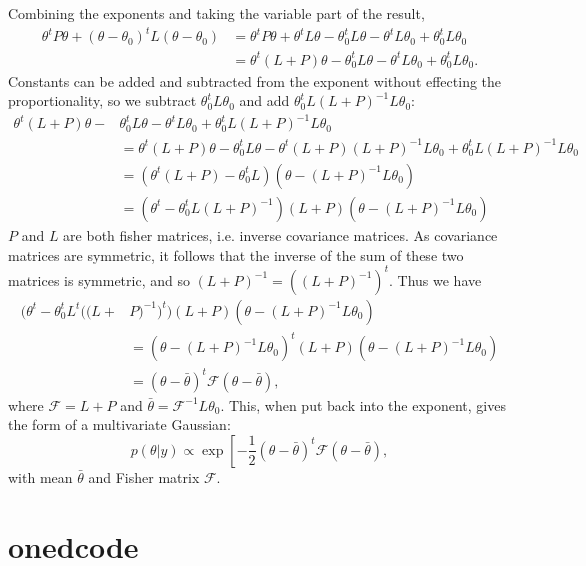 \documentclass[a4paper,11pt,twoside]{article}
\begin{document}
Combining the exponents and taking the variable part of the result,
\begin{align*}
	\theta^t P \theta + (\theta - \theta_0)^t L (\theta - \theta_0) &= \theta^t P \theta + \theta^t L \theta - \theta_0^t L \theta - \theta^t L \theta_0 + \theta_0^t L \theta_0
	\\ &= \theta^t(L+P) \theta - \theta_0^t L \theta - \theta^t L \theta_0 + \theta_0^t L \theta_0.
\end{align*}
Constants can be added and subtracted from the exponent without effecting the proportionality, so we subtract $\theta_0^t L \theta_0$ and add $\theta_0^t L (L+P)^{-1} L \theta_0$:
\begin{align*}
	\theta^t(L+P) \theta - & \theta_0^t L \theta - \theta^t L \theta_0 + \theta_0^t L (L+P)^{-1} L \theta_0
	\\ &= \theta^t(L+P) \theta - \theta_0^t L \theta - \theta^t(L+P)(L+P)^{-1} L \theta_0 + \theta_0^t L (L+P)^{-1} L \theta_0
	\\ &= (\theta^t(L+P) - \theta_0^t L)(\theta - (L+P)^{-1} L \theta_0)
	\\ &= (\theta^t - \theta_0^t L (L+P)^{-1})(L+P)(\theta - (L+P)^{-1} L \theta_0)
\end{align*}
$P$ and $L$ are both fisher matrices, i.e. inverse covariance matrices. As
covariance matrices are symmetric, it follows that the inverse of the sum of
these two matrices is symmetric, and so $(L+P)^{-1} = ((L+P)^{-1})^{t}$. Thus we have
\begin{align*}
	(\theta^t - \theta_0^t L^t ((L+ & P)^{-1})^{t}) (L+P) (\theta - (L+P)^{-1} L \theta_0)
	\\ &= (\theta -(L+P)^{-1} L \theta_0)^{t} (L+P) (\theta - (L+P)^{-1} L \theta_0)
	\\ &= (\theta - \bar{\theta})^t \mathcal{F} (\theta - \bar{\theta}),
\end{align*}
where $\mathcal{F} = L + P$ and $\bar{\theta} = \mathcal{F}^{-1} L \theta_0$.
This, when put back into the exponent, gives the form of a multivariate
Gaussian:
\begin{equation*}
	p(\theta|y) \propto \exp \left[-\frac{1}{2}(\theta - \bar{\theta})^t \mathcal{F} (\theta - \bar{\theta}),
\end{equation*}
with mean $\bar{\theta}$ and Fisher matrix $\mathcal{F}$.

\section{onedcode} 
\label{sec:onedcode}
\end{document}
